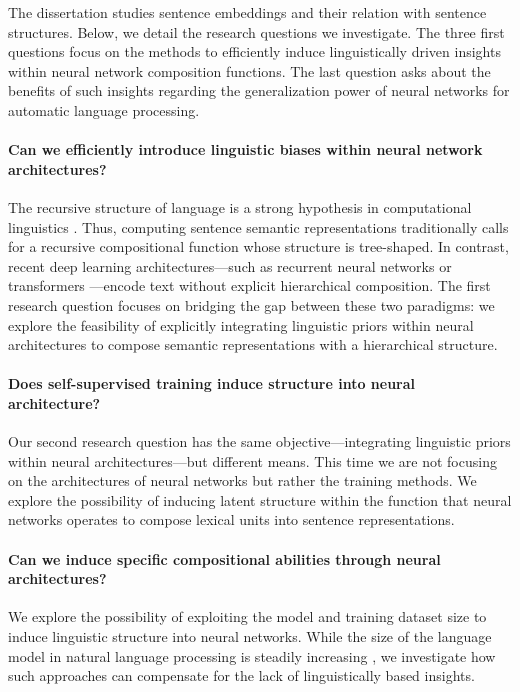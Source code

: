 The dissertation studies sentence embeddings and their relation with sentence structures. Below, we detail the research questions we investigate. The three first questions focus on the methods to efficiently induce linguistically driven insights within neural network composition functions. The last question asks about the benefits of such insights regarding the generalization power of neural networks for automatic language processing.

\paragraph{Can we efficiently introduce linguistic biases within neural network architectures?} The recursive structure of language is a strong hypothesis in computational linguistics \parencite{chomsky_56}. Thus, computing sentence semantic representations traditionally calls for a recursive compositional function whose structure is tree-shaped. In contrast, recent deep learning architectures—such as recurrent neural networks \parencite{hochreiter_97, cho_14} or transformers \parencite{vaswani_17}—encode text without explicit hierarchical composition. The first research question focuses on bridging the gap between these two paradigms: we explore the feasibility of explicitly integrating linguistic priors within neural architectures to compose semantic representations with a hierarchical structure.

\paragraph{Does self-supervised training induce structure into neural architecture?}

Our second research question has the same objective—integrating linguistic priors within neural architectures—but different means. This time we are not focusing on the architectures of neural networks but rather the training methods. We explore the possibility of inducing latent structure within the function that neural networks operates to compose lexical units into sentence representations.

\paragraph{Can we induce specific compositional abilities through neural architectures?}

We explore the possibility of exploiting the model and training dataset size to induce linguistic structure into neural networks. While the size of the language model in natural language processing is steadily increasing \parencite{devlin_19, brown_20}, we investigate how such approaches can compensate for the lack of linguistically based insights.

